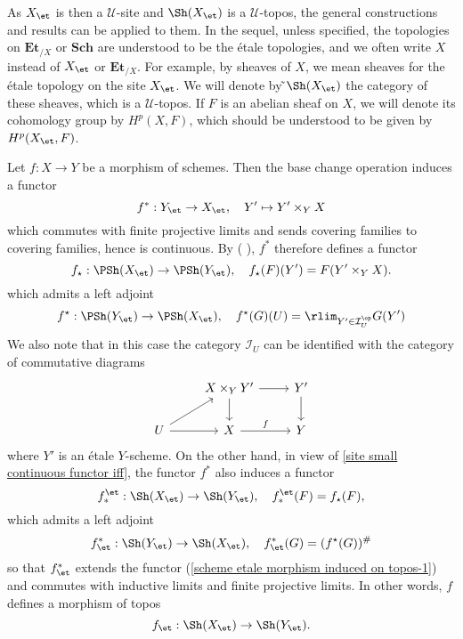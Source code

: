 As $X_\et$ is then a $\mathscr{U}$-site and $\Sh(X_\et)$ is a $\mathscr{U}$-topos, the general constructions and results can be applied to them. In the sequel, unless specified, the topologies on $\mathbf{Et}_{/X}$ or $\mathbf{Sch}$ are understood to be the \'etale topologies, and we often write $X$ instead of $X_\et$ or $\mathbf{Et}_{/X}$. For example, by sheaves of $X$, we mean sheaves for the \'etale topology on the site $X_{\et}$. We will denote by ̃$\Sh(X_\et)$ the category of these sheaves, which is a $\mathscr{U}$-topos. If $F$ is an abelian sheaf on $X$, we will denote its cohomology group by $H^p(X,F)$, which should be understood to be given by $H^p(X_\et,F)$.\par
Let $f:X\to Y$ be a morphism of schemes. Then the base change operation induces a functor
\begin{equation}\label{scheme etale morphism induced on topos-1}
f^*:Y_\et\to X_\et,\quad Y'\mapsto Y'\times_YX
\end{equation}
which commutes with finite projective limits and sends covering families to covering families, hence is continuous. By (\cite{SGA4-1} ), $f^*$ therefore defines a functor
\[f_\star:\PSh(X_\et)\to\PSh(Y_\et),\quad f_\star(F)(Y')=F(Y'\times_YX).\]
which admits a left adjoint
\[f^\star:\PSh(Y_\et)\to\PSh(X_\et),\quad f^\star(G)(U)=\rlim_{Y'\in\mathcal{I}_{U}^{\op}}G(Y')\]
We also note that in this case the category $\mathcal{I}_U$ can be identified with the category of commutative diagrams
\[\begin{tikzcd}
&X\times_YY'\ar[r]\ar[d]&Y'\ar[d]\\
U\ar[ru]\ar[r]&X\ar[r,"f"]&Y
\end{tikzcd}\]
where $Y'$ is an \'etale $Y$-scheme. On the other hand, in view of \cref{site small continuous functor iff}, the functor $f^*$ also induces a functor
\begin{equation}\label{scheme etale morphism induced on topos-2}
f_*^\et:\Sh(X_\et)\to\Sh(Y_\et),\quad f_*^\et(F)=f_\star(F),
\end{equation}
which admits a left adjoint
\begin{equation}\label{scheme etale morphism induced on topos-3}
f^*_\et:\Sh(Y_\et)\to\Sh(X_\et),\quad f^*_\et(G)=(f^\star(G))^\#
\end{equation}
so that $f^*_\et$ extends the functor (\ref{scheme etale morphism induced on topos-1}) and commutes with inductive limits and finite projective limits. In other words, $f$ defines a morphism of topos
\[f_\et:\Sh(X_\et)\to\Sh(Y_\et).\]

